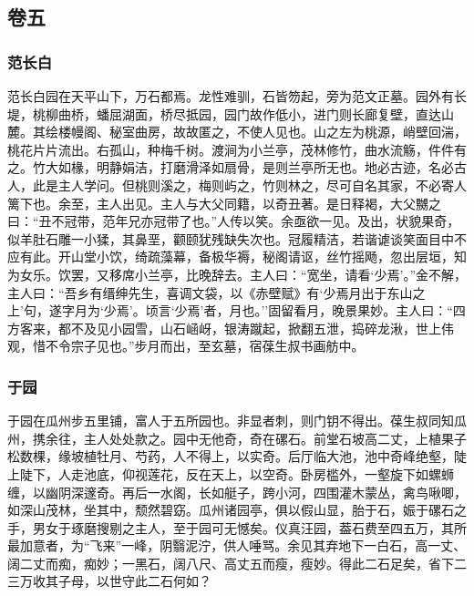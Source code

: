 \documentclass[]{article}
\begin{document}
\hypertarget{header-n351}{%
\subsection{卷五}\label{header-n351}}

\hypertarget{header-n353}{%
\subsubsection{范长白}\label{header-n353}}

范长白园在天平山下，万石都焉。龙性难驯，石皆笏起，旁为范文正墓。园外有长堤，桃柳曲桥，蟠屈湖面，桥尽抵园，园门故作低小，进门则长廊复壁，直达山麓。其绘楼幔阁、秘室曲房，故故匿之，不使人见也。山之左为桃源，峭壁回湍，桃花片片流出。右孤山，种梅千树。渡涧为小兰亭，茂林修竹，曲水流觞，件件有之。竹大如椽，明静娟洁，打磨滑泽如扇骨，是则兰亭所无也。地必古迹，名必古人，此是主人学问。但桃则溪之，梅则屿之，竹则林之，尽可自名其家，不必寄人篱下也。余至，主人出见。主人与大父同籍，以奇丑著。是日释褐，大父嬲之曰：``丑不冠带，范年兄亦冠带了也。''人传以笑。余亟欲一见。及出，状貌果奇，似羊肚石雕一小猱，其鼻垩，颧颐犹残缺失次也。冠履精洁，若谐谑谈笑面目中不应有此。开山堂小饮，绮疏藻幕，备极华褥，秘阁请讴，丝竹摇飏，忽出层垣，知为女乐。饮罢，又移席小兰亭，比晚辞去。主人曰：``宽坐，请看`少焉'。''金不解，主人曰：``吾乡有缙绅先生，喜调文袋，以《赤壁赋》有`少焉月出于东山之上'句，遂字月为`少焉'。顷言`少焉'者，月也。''固留看月，晚景果妙。主人曰：``四方客来，都不及见小园雪，山石崡岈，银涛蹴起，掀翻五泄，捣碎龙湫，世上伟观，惜不令宗子见也。''步月而出，至玄墓，宿葆生叔书画舫中。

\hypertarget{header-n358}{%
\subsubsection{于园}\label{header-n358}}

于园在瓜州步五里铺，富人于五所园也。非显者刺，则门钥不得出。葆生叔同知瓜州，携余往，主人处处款之。园中无他奇，奇在磥石。前堂石坡高二丈，上植果子松数棵，缘坡植牡月、芍药，人不得上，以实奇。后厅临大池，池中奇峰绝壑，陡上陡下，人走池底，仰视莲花，反在天上，以空奇。卧房槛外，一壑旋下如螺蛳缠，以幽阴深邃奇。再后一水阁，长如艇子，跨小河，四围灌木蒙丛，禽鸟啾唧，如深山茂林，坐其中，颓然碧窈。瓜州诸园亭，俱以假山显，胎于石，娠于磥石之手，男女于琢磨搜剔之主人，至于园可无憾矣。仪真汪园，葢石费至四五万，其所最加意者，为``飞来''一峰，阴翳泥泞，供人唾骂。余见其弃地下一白石，高一丈、阔二丈而痴，痴妙；一黑石，阔八尺、高丈五而瘦，瘦妙。得此二石足矣，省下二三万收其子母，以世守此二石何如？
\end{document}
